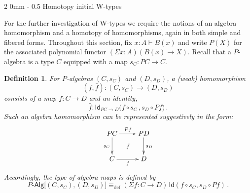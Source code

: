 \documentclass[reqno,10pt,a4paper,oneside]{amsart}
\makeatletter
\numberwithin{equation}{section}
\renewcommand{\subsection}{\@startsection
  {subsection}%
  {2}%
  {0mm}%
  {-\baselineskip}%
  {0.5\baselineskip}%
  {\normalfont\normalsize\bf}}%
\theoremstyle{mythm}
\theoremstyle{mydef}
\newtheorem{definition}[theorem]{Definition}
\theoremstyle{myrmk}
\newcommand{\deq}{\equiv}
\newcommand{\defeq}{\deq_{\mathrm{def}}}
\newcommand{\prd}[1]{\Pi_{#1}}
\newcommand{\lam}[1]{\lambda_{#1}}
\newcommand{\Id}{\mathsf{Id}}
\newcommand{\id}[1]{\Id_{#1}}
\newcommand{\W}{\mathsf{W}}
\newcommand{\wsup}{\mathsf{sup}}
\newcommand{\UU}{\mathsf{U}}
\newcommand{\Palg}{P\text{-}\mathsf{Alg}}
\makeatother
\begin{document}
%



\subsection{Homotopy initial W-types}

For the further investigation of W-types we require the notions of an algebra homomorphism and a homotopy of homomorphisms, again in both simple and fibered forms.  Throughout this section, fix $x:A\vdash B(x)$ and write $P(X)$ for the associated polynomial functor $(\Sigma x : A) (B(x) \rightarrow X)$.  Recall that a $P$-algebra is a type $C$ equipped with a map
$s_C :  PC \rightarrow C$.  

\begin{definition}
For $P$-algebras $(C,s_C)$ and $(D,s_D)$, a \emph{(weak) 
homomorphism}  $$(f, \bar{f}) : (C, s_C) \rightarrow (D, s_D)$$
consists of a map $f : C \rightarrow D$ and an identity,
\[
\bar{f} : \id{PC \rightarrow D}\big( f \circ s_C \, ,  s_{D} \circ Pf \big) \, .
\]
Such an algebra homomorphism can be represented suggestively in the form:
\[
\xymatrix{
 PC \ar[d]_{s_C} \ar[r]^{Pf}  \ar@{}[dr]|{\bar{f}} &  PD \ar[d]^{s_D}\\
C \ar[r]_{f}   & D }
\] 
Accordingly, the type of algebra maps is defined by
\[
\Palg
\big[ (C,s_C), (D, s_D)  \big]
 \defeq  
(\Sigma f:  C \rightarrow D) \, \Id(f\circ s_C, s_D\circ Pf) \, .
\]
\end{definition}
\medskip
\end{document}
